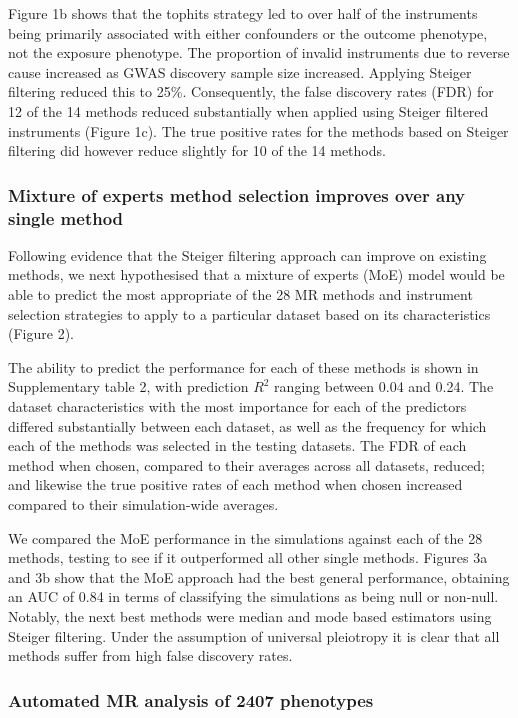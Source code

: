 \documentclass[]{article}
\begin{document}
Figure 1b shows that the tophits strategy led to over half of the
instruments being primarily associated with either confounders or the
outcome phenotype, not the exposure phenotype. The proportion of invalid
instruments due to reverse cause increased as GWAS discovery sample size
increased. Applying Steiger filtering reduced this to 25\%.
Consequently, the false discovery rates (FDR) for 12 of the 14 methods
reduced substantially when applied using Steiger filtered instruments
(Figure 1c). The true positive rates for the methods based on Steiger
filtering did however reduce slightly for 10 of the 14 methods.

\subsubsection{Mixture of experts method selection improves over any
single
method}\label{mixture-of-experts-method-selection-improves-over-any-single-method}

Following evidence that the Steiger filtering approach can improve on
existing methods, we next hypothesised that a mixture of experts (MoE)
model would be able to predict the most appropriate of the 28 MR methods
and instrument selection strategies to apply to a particular dataset
based on its characteristics (Figure 2).

The ability to predict the performance for each of these methods is
shown in Supplementary table 2, with prediction \(R^2\) ranging between
0.04 and 0.24. The dataset characteristics with the most importance for
each of the predictors differed substantially between each dataset, as
well as the frequency for which each of the methods was selected in the
testing datasets. The FDR of each method when chosen, compared to their
averages across all datasets, reduced; and likewise the true positive
rates of each method when chosen increased compared to their
simulation-wide averages.

We compared the MoE performance in the simulations against each of the
28 methods, testing to see if it outperformed all other single methods.
Figures 3a and 3b show that the MoE approach had the best general
performance, obtaining an AUC of 0.84 in terms of classifying the
simulations as being null or non-null. Notably, the next best methods
were median and mode based estimators using Steiger filtering. Under the
assumption of universal pleiotropy it is clear that all methods suffer
from high false discovery rates.

\subsubsection{Automated MR analysis of 2407
phenotypes}\label{automated-mr-analysis-of-2407-phenotypes}
\end{document}
